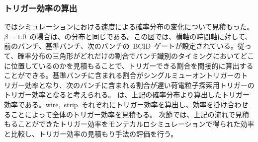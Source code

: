 \subsubsection{トリガー効率の算出}\label{sec:prot}
ではシミュレーションにおける速度による確率分布の変化について見積もった。$\beta=1.0$~の場合は、の分布と同じである。この図では、横軸の時間軸に対して、前のバンチ、基準バンチ、次のバンチの~BCID~ゲートが設定されている。従って、確率分布の三角形がどれだけの割合でバンチ識別のタイミングにおいてどこに位置しているのかを見積もることで、トリガーできる割合を間接的に算出することができる。基準バンチに含まれる割合がシングルミューオントリガーのトリガー効率となり、次のバンチに含まれる割合が遅い荷電粒子探索用トリガーのトリガー効率となると考えられる。
は、上記の確率分布より算出したトリガー効率である。wire,~strip~それぞれにトリガー効率を算出し、効率を掛け合わせることによって全体のトリガー効率を見積もる。
次節では、上記の流れで見積もることができたトリガー効率をモンテカルロシミュレーションで得られた効率と比較し、トリガー効率の見積もり手法の評価を行う。
